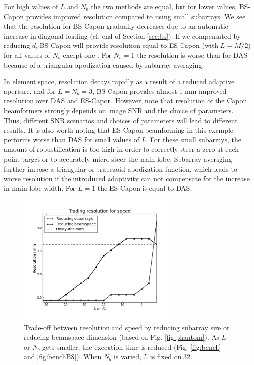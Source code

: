 \documentclass[journal]{IEEEtran}
\begin{document}
For high values of $L$ and $N_b$ the two methods are equal, but for lower values, BS-Capon provides improved resolution compared to using small subarrays. We see that the resolution for BS-Capon gradually decreases due to an automatic increase in diagonal loading (cf. end of Section \ref{sec:bs}). If we compensated by reducing $d$, BS-Capon will provide resolution equal to ES-Capon (with $L=M/2$) for all values of $N_b$ except one \cite{Nilsen2009}. For $N_b=1$ the resolution is worse than for DAS because of a triangular apodization caused by subarray averaging. 

In element space, resolution decays rapidly as a result of a reduced adaptive aperture, and for $L = N_b=3$, BS-Capon provides almost 1 mm improved resolution over DAS and ES-Capon. However, note that resolution of the Capon beamformers strongly depends on image SNR and the choice of parameters. Thus, different SNR scenarios and choices of parameters will lead to different results. It is also worth noting that ES-Capon beamforming in this example performs worse than DAS for small values of $L$. For these small subarrays, the amount of robustification is too high in order to correctly steer a zero at each point target or to accurately micro-steer the main lobe. Subarray averaging further impose a triangular or trapezoid apodization function, which leads to worse resolution if the introduced adaptivity can not compensate for the increase in main lobe width. For $L=1$ the ES-Capon is equal to DAS.

\begin{figure}
\centering
\includegraphics[width=3in]{gfx/speed_res_trade_d=0-01.png}
\caption{Trade-off between resolution and speed by reducing subarray size or reducing beamspace dimension (based on Fig. \ref{fig:phantom}). As $L$ or $N_b$ gets smaller, the execution time is reduced (Fig. \ref{fig:bench} and \ref{fig:benchBS}). When $N_b$ is varied, $L$ is fixed on 32.}
\label{fig:speed_res_trade}
\end{figure}
\end{document}
